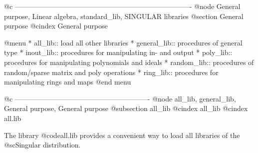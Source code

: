 @c ----------------------------------------------------------------------------
@node General purpose, Linear algebra, standard_lib, SINGULAR libraries
@section General purpose
@cindex General purpose

@menu
* all_lib:: load all other libraries
* general_lib:: procedures of general type
* inout_lib:: procedures for manipulating in- and output
* poly_lib:: procedures for manipulating polynomials and ideals
* random_lib:: procedures of random/sparse  matrix and poly operations
* ring_lib:: procedures for manipulating rings and maps
@end menu

@c ----------------------------------------------------------
@node all_lib, general_lib, General purpose, General purpose
@subsection all_lib
@cindex all_lib
@cindex all.lib

The library @code{all.lib} provides a convenient way to load all
libraries of the @sc{Singular} distribution.

